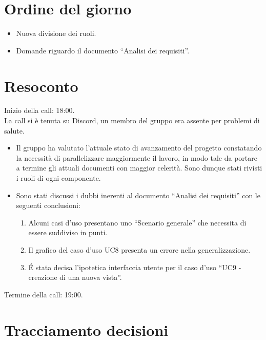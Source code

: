 \section{Ordine del giorno}

\begin{itemize}
	\item Nuova divisione dei ruoli.
	\item Domande riguardo il documento ``Analisi dei requisiti''.
\end{itemize}

\section{Resoconto}
\label{sec:Resoconto}

\noindent 
Inizio della call: 18:00. \\
\noindent La call si è tenuta su Discord, un membro del gruppo era assente per problemi di salute.
\begin{itemize}
	\item Il gruppo ha valutato l'attuale stato di avanzamento del progetto constatando la necessità di parallelizzare maggiormente il lavoro, in modo tale da portare a termine gli attuali documenti con maggior celerità. Sono dunque stati rivisti i ruoli di ogni componente.
	\item Sono stati discussi i dubbi inerenti al documento ``Analisi dei requisiti'' con le seguenti conclusioni:
		\begin{enumerate}
			\item Alcuni casi d'uso presentano uno ``Scenario generale'' che necessita di essere suddiviso in punti.
			\item Il grafico del caso d'uso UC8 presenta un errore nella generalizzazione.
			\item \' E stata decisa l'ipotetica interfaccia utente per il caso d'uso ``UC9 - creazione di una nuova vista''.
		\end{enumerate}
\end{itemize}

\noindent Termine della call: 19:00.

\section{Tracciamento decisioni}

